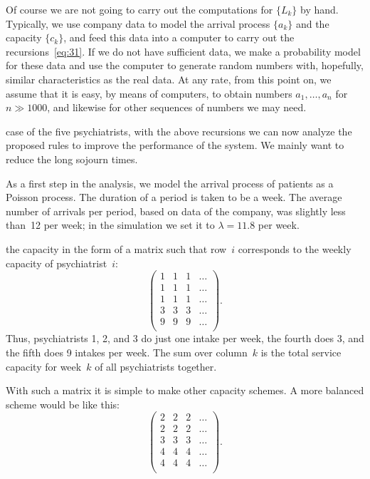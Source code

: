 \documentclass[stochastic-or.tex]{subfiles}
\begin{document}
Of course we are not going to carry out the computations for $\{L_k\}$ by hand.
Typically, we use company data to model the arrival process $\{a_k\}$ and the capacity $\{c_k\}$, and feed this data into a computer to carry out the recursions~\cref{eq:31}.
If we do not have sufficient data, we make a probability model for these data and use the computer to generate random numbers with, hopefully, similar characteristics as the real data.
At any rate, from this point on, we assume that it is easy, by means of computers, to obtain numbers $a_1,\ldots, a_n$ for $n\gg 1000$, and likewise for other sequences of numbers we may need.


 case of the five psychiatrists, with the above recursions we can now analyze the proposed rules to improve the performance of the system.
We mainly want to reduce the long sojourn times.

As a first step in the analysis, we model the arrival process of patients as a Poisson process.
The duration of a period is taken to be a week.
The average number of arrivals per period, based on data of the company, was slightly less than~12 per week; in the simulation we set it to $\lambda= 11.8$ per week.

 the capacity in the form of a matrix such that row~$i$ corresponds to the weekly capacity of psychiatrist~$i$:
\begin{equation}\label{eq:6}
 \begin{pmatrix}
 1 & 1 & 1 & \ldots\\
 1 & 1 & 1 & \ldots\\
 1 & 1 & 1 & \ldots\\
 3 & 3 & 3 & \ldots\\
 9 & 9 & 9 & \ldots\\
 \end{pmatrix}.
\end{equation}
Thus, psychiatrists 1, 2, and 3 do just one intake per week, the
fourth does 3, and the fifth does 9 intakes per week. The sum over
column~$k$ is the total service capacity for week~$k$ of all
psychiatrists together.

With such a matrix it is simple to make other capacity schemes.
A more balanced scheme would be like this:
\begin{equation}\label{eq:9}
 \begin{pmatrix}
 2 & 2 & 2 & \ldots\\
 2 & 2 & 2 & \ldots\\
 3 & 3 & 3 & \ldots\\
 4 & 4 & 4 & \ldots\\
 4 & 4 & 4 & \ldots\\
 \end{pmatrix}.
\end{equation}
\end{document}
